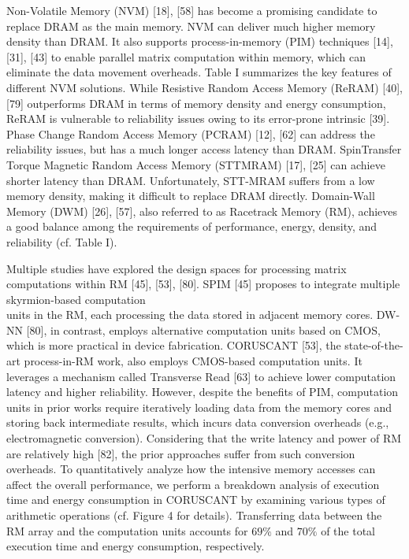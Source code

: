 \documentclass[10pt]{article}
\begin{document}
Non-Volatile Memory (NVM) [18], [58] has become a promising candidate to replace DRAM as the main memory. NVM can deliver much higher memory density than DRAM. It also supports process-in-memory (PIM) techniques [14], [31], [43] to enable parallel matrix computation within memory, which can eliminate the data movement overheads. Table I summarizes the key features of different NVM solutions. While Resistive Random Access Memory (ReRAM) [40], [79] outperforms DRAM in terms of memory density and energy consumption, ReRAM is vulnerable to reliability issues owing to its error-prone intrinsic [39]. Phase Change Random Access Memory (PCRAM) [12], [62] can address the reliability issues, but has a much longer access latency than DRAM. SpinTransfer Torque Magnetic Random Access Memory (STTMRAM) [17], [25] can achieve shorter latency than DRAM. Unfortunately, STT-MRAM suffers from a low memory density, making it difficult to replace DRAM directly. Domain-Wall Memory (DWM) [26], [57], also referred to as Racetrack Memory (RM), achieves a good balance among the requirements of performance, energy, density, and reliability (cf. Table I).

Multiple studies have explored the design spaces for processing matrix computations within RM [45], [53], [80]. SPIM [45] proposes to integrate multiple skyrmion-based computation\\
units in the RM, each processing the data stored in adjacent memory cores. DW-NN [80], in contrast, employs alternative computation units based on CMOS, which is more practical in device fabrication. CORUSCANT [53], the state-of-the-art process-in-RM work, also employs CMOS-based computation units. It leverages a mechanism called Transverse Read [63] to achieve lower computation latency and higher reliability. However, despite the benefits of PIM, computation units in prior works require iteratively loading data from the memory cores and storing back intermediate results, which incurs data conversion overheads (e.g., electromagnetic conversion). Considering that the write latency and power of RM are relatively high [82], the prior approaches suffer from such conversion overheads. To quantitatively analyze how the intensive memory accesses can affect the overall performance, we perform a breakdown analysis of execution time and energy consumption in CORUSCANT by examining various types of arithmetic operations (cf. Figure 4 for details). Transferring data between the RM array and the computation units accounts for $69 \%$ and $70 \%$ of the total execution time and energy consumption, respectively.
\end{document}
